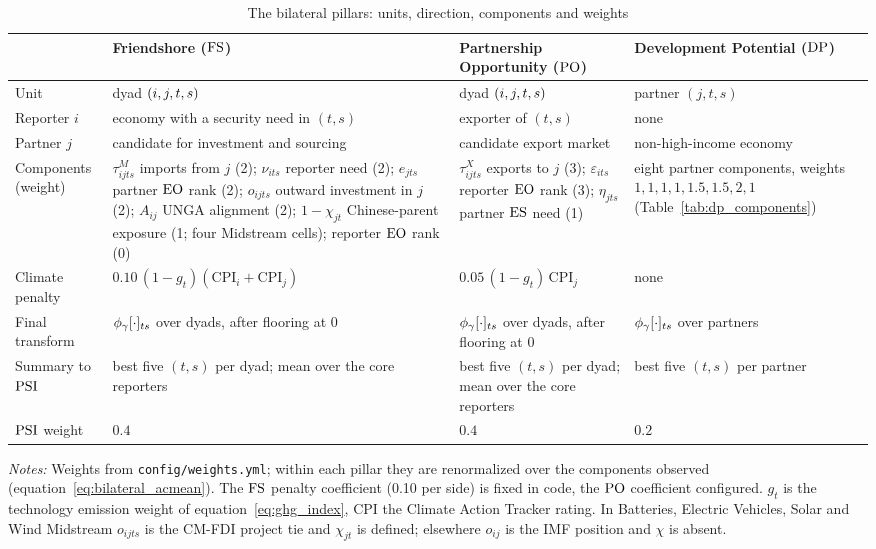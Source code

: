 \begin{table}[tbp]
\centering
\begin{threeparttable}
\caption{The bilateral pillars: units, direction, components and weights}
\label{tab:bilateral_pillars}
\footnotesize
\begin{tabularx}{\textwidth}{@{}>{\raggedright\arraybackslash}p{2.2cm}
  >{\raggedright\arraybackslash}X >{\raggedright\arraybackslash}X
  >{\raggedright\arraybackslash}X@{}}
\toprule
 & Friendshore ($\mathrm{FS}$) & Partnership Opportunity ($\mathrm{PO}$) & Development Potential ($\mathrm{DP}$)\\
\midrule
Unit & dyad $(i,j,t,s)$ & dyad $(i,j,t,s)$ & partner $(j,t,s)$\\
Reporter $i$ & economy with a security need in $(t,s)$ & exporter of $(t,s)$ & none\\
Partner $j$ & candidate for investment and sourcing & candidate export market & non-high-income economy\\
Components (weight) &
  $\tau^{M}_{ijts}$ imports from $j$ (2); $\nu_{its}$ reporter need (2); $e_{jts}$ partner $\mathrm{EO}$
  rank (2); $o_{ijts}$ outward investment in $j$ (2); $A_{ij}$ UNGA alignment (2); $1-\chi_{jt}$
  Chinese-parent exposure (1; four Midstream cells); reporter $\mathrm{EO}$ rank (0) &
  $\tau^{X}_{ijts}$ exports to $j$ (3); $\varepsilon_{its}$ reporter $\mathrm{EO}$ rank (3);
  $\eta_{jts}$ partner $\mathrm{ES}$ need (1) &
  eight partner components, weights $1,1,1,1,1.5,1.5,2,1$ (Table~\ref{tab:dp_components})\\
Climate penalty & $0.10\,(1-g_t)(\mathrm{CPI}_i+\mathrm{CPI}_j)$ & $0.05\,(1-g_t)\,\mathrm{CPI}_j$
  & none\\
Final transform & ${\phi_{\gamma}}[\cdot]_{ts}$ over dyads, after flooring at 0 & ${\phi_{\gamma}}[\cdot]_{ts}$
  over dyads, after flooring at 0 & ${\phi_{\gamma}}[\cdot]_{ts}$ over partners\\
Summary to $\mathrm{PSI}$ & best five $(t,s)$ per dyad; mean over the core reporters & best five $(t,s)$
  per dyad; mean over the core reporters & best five $(t,s)$ per partner\\
$\mathrm{PSI}$ weight & $0.4$ & $0.4$ & $0.2$\\
\bottomrule
\end{tabularx}
\begin{tablenotes}[flushleft]\footnotesize
\item \textit{Notes:} Weights from \texttt{config/weights.yml}; within each pillar they are
renormalized over the components observed (equation~\eqref{eq:bilateral_acmean}). The $\mathrm{FS}$ penalty
coefficient (0.10 per side) is fixed in code, the $\mathrm{PO}$ coefficient configured. $g_t$ is the
technology emission weight of equation~\eqref{eq:ghg_index}, $\mathrm{CPI}$ the Climate Action
Tracker rating. In Batteries, Electric Vehicles, Solar and Wind Midstream $o_{ijts}$ is the CM-FDI
project tie and $\chi_{jt}$ is defined; elsewhere $o_{ij}$ is the IMF position and $\chi$ is absent.
\end{tablenotes}
\end{threeparttable}
\end{table}

